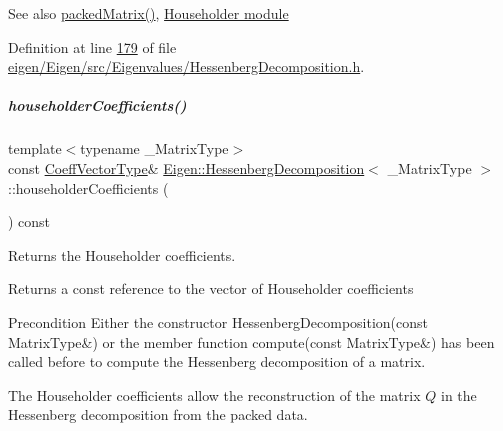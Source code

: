 \begin{DoxySeeAlso}{See also}
\hyperlink{group___eigenvalues___module_a1f72b7612fd4edc5a6f31005e433e1dd}{packed\+Matrix()}, \hyperlink{group___householder___module}{Householder module} 
\end{DoxySeeAlso}


Definition at line \hyperlink{eigen_2_eigen_2src_2_eigenvalues_2_hessenberg_decomposition_8h_source_l00179}{179} of file \hyperlink{eigen_2_eigen_2src_2_eigenvalues_2_hessenberg_decomposition_8h_source}{eigen/\+Eigen/src/\+Eigenvalues/\+Hessenberg\+Decomposition.\+h}.

\mbox{\label{group___eigenvalues___module_a65fa81ce79d956baa59a30a6d82f8a84}} 
\subparagraph{\texorpdfstring{householder\+Coefficients()}{householderCoefficients()}\hspace{0.1cm}{\footnotesize\ttfamily [2/2]}}
{\footnotesize\ttfamily template$<$typename \+\_\+\+Matrix\+Type$>$ \\
const \hyperlink{group___eigenvalues___module_a567f99f3770365777b67bf9832b6fac1}{Coeff\+Vector\+Type}\& \hyperlink{group___eigenvalues___module_class_eigen_1_1_hessenberg_decomposition}{Eigen\+::\+Hessenberg\+Decomposition}$<$ \+\_\+\+Matrix\+Type $>$\+::householder\+Coefficients (\begin{DoxyParamCaption}{ }\end{DoxyParamCaption}) const\hspace{0.3cm}{\ttfamily [inline]}}



Returns the Householder coefficients. 

\begin{DoxyReturn}{Returns}
a const reference to the vector of Householder coefficients
\end{DoxyReturn}
\begin{DoxyPrecond}{Precondition}
Either the constructor Hessenberg\+Decomposition(const Matrix\+Type\&) or the member function compute(const Matrix\+Type\&) has been called before to compute the Hessenberg decomposition of a matrix.
\end{DoxyPrecond}
The Householder coefficients allow the reconstruction of the matrix $ Q $ in the Hessenberg decomposition from the packed data.

